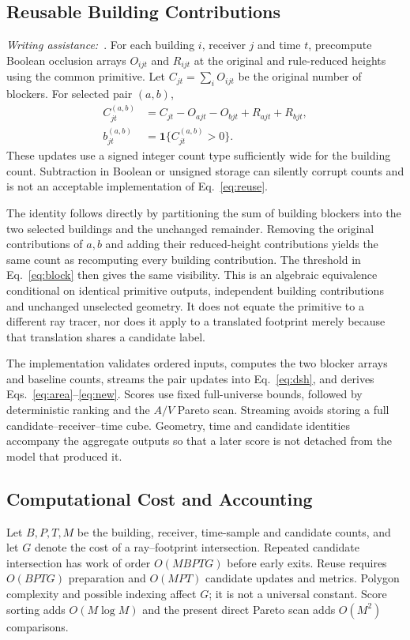\documentclass{llncs}
\newcommand{\aidraft}{\textit{Writing assistance:}~\cite{openai2026}. }
\newcommand{\ind}{\mathbf{1}}
\begin{document}
\subsection{Reusable Building Contributions}
\aidraft{}For each building $i$, receiver $j$ and time $t$, precompute Boolean occlusion arrays $O_{ijt}$ and $R_{ijt}$ at the original and rule-reduced heights using the common primitive. Let $C_{jt}=\sum_i O_{ijt}$ be the original number of blockers. For selected pair $(a,b)$,
\begin{align}
 C_{jt}^{(a,b)}&=C_{jt}-O_{ajt}-O_{bjt}+R_{ajt}+R_{bjt},\label{eq:reuse}\\
 b_{jt}^{(a,b)}&=\ind\{C_{jt}^{(a,b)}>0\}.\label{eq:block}
\end{align}
These updates use a signed integer count type sufficiently wide for the building count. Subtraction in Boolean or unsigned storage can silently corrupt counts and is not an acceptable implementation of Eq.~\ref{eq:reuse}.

The identity follows directly by partitioning the sum of building blockers into the two selected buildings and the unchanged remainder. Removing the original contributions of $a,b$ and adding their reduced-height contributions yields the same count as recomputing every building contribution. The threshold in Eq.~\ref{eq:block} then gives the same visibility. This is an algebraic equivalence conditional on identical primitive outputs, independent building contributions and unchanged unselected geometry. It does not equate the primitive to a different ray tracer, nor does it apply to a translated footprint merely because that translation shares a candidate label.

The implementation validates ordered inputs, computes the two blocker arrays and baseline counts, streams the pair updates into Eq.~\ref{eq:dsh}, and derives Eqs.~\ref{eq:area}--\ref{eq:new}. Scores use fixed full-universe bounds, followed by deterministic ranking and the $A/V$ Pareto scan. Streaming avoids storing a full candidate--receiver--time cube. Geometry, time and candidate identities accompany the aggregate outputs so that a later score is not detached from the model that produced it.

\subsection{Computational Cost and Accounting}
Let $B,P,T,M$ be the building, receiver, time-sample and candidate counts, and let $G$ denote the cost of a ray--footprint intersection. Repeated candidate intersection has work of order $O(MBPTG)$ before early exits. Reuse requires $O(BPTG)$ preparation and $O(MPT)$ candidate updates and metrics. Polygon complexity and possible indexing affect $G$; it is not a universal constant. Score sorting adds $O(M\log M)$ and the present direct Pareto scan adds $O(M^2)$ comparisons.
\end{document}
